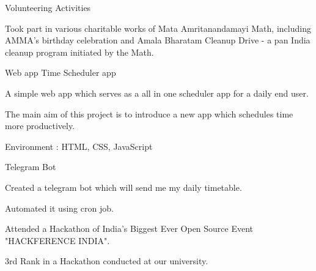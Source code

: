 \documentclass[11pt, a4paper]{awesome-cv}
\begin{document}
\begin{cventries}
  \cventry
    {Volunteering} %
    {Activities} %
    {} %
    {} %
    {
      \begin{cvitems} %
        \item {Took part in various charitable works of Mata Amritanandamayi Math, including AMMA's birthday celebration and Amala Bharatam Cleanup Drive - a pan India cleanup program initiated by the Math.}
      \end{cvitems}
   }
\end{cventries}



\begin{cventries}
  \cventry
    {Web app} %
    {Time Scheduler app} %
    {} %
    {} %
    {
      \begin{cvitems} %
        \item {A simple web app which serves as a all in one scheduler app for a daily end user.}
       \item{The main aim of this project is to introduce a new app which schedules time more productively.}
       \item{Environment : HTML, CSS, JavaScript}
      \end{cvitems}
    }
    
   \cventry
   	{} %
    {Telegram Bot} %
    {} %
    {} %
    {
      \begin{cvitems}%
      	\item{Created a telegram bot which will send me my daily timetable. }
        \item{Automated it using cron job.}
        \end{cvitems}
    }
\end{cventries}


\begin{cventries}
	\cventry
    {} %
    {} %
    {} %
    {} %
    {
      \begin{cvitems} %
        \item {Attended a Hackathon of India's Biggest Ever Open Source Event "HACKFERENCE INDIA".}
        \item{3rd Rank in a Hackathon conducted at our university.}
      \end{cvitems}
    }    
\end{cventries}

\end{document}
